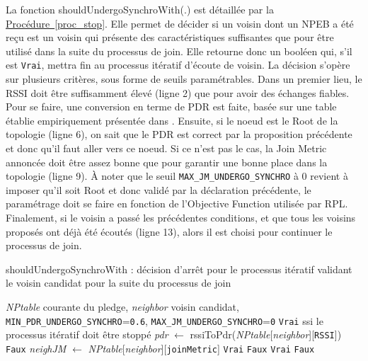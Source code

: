 \documentclass[]{report}
\newcommand{\wordlink}[2]{\hyperref[#2]{#1~\ref{#2}}}
\begin{document}
La fonction shouldUndergoSynchroWith(.) est détaillée par la \wordlink{Procédure}{proc_stop}.
Elle permet de décider si un voisin dont un NPEB a été reçu est un voisin qui présente des caractéristiques suffisantes que pour être utilisé dans la suite du processus de join. Elle retourne donc un booléen qui, s'il est \texttt{Vrai}, mettra fin au processus itératif d'écoute de voisin. La décision s'opère sur plusieurs critères, sous forme de seuils paramétrables. Dans un premier lieu, le RSSI doit être suffisamment élevé (ligne 2) que pour avoir des échanges fiables. Pour se faire, une conversion en terme de PDR est faite, basée sur une table établie empiriquement présentée dans \cite{simulating-6TiSCH}. Ensuite, si le noeud est le Root de la topologie (ligne 6), on sait que le PDR est correct par la proposition précédente et donc qu'il faut aller vers ce noeud. Si ce n'est pas le cas, la Join Metric annoncée doit être assez bonne que pour garantir une bonne place dans la topologie (ligne 9). À noter que le seuil \texttt{MAX\_JM\_UNDERGO\_SYNCHRO} à 0 revient à imposer qu'il soit Root et donc validé par la déclaration précédente, le paramétrage doit se faire en fonction de l'Objective Function utilisée par RPL. Finalement, si le voisin a passé les précédentes conditions, et que tous les voisins proposés ont déjà été écoutés (ligne 13), alors il est choisi pour continuer le processus de join. 

\newpage

\begin{algorithm}[!h]
\caption{shouldUndergoSynchroWith : décision d'arrêt pour le processus itératif validant le voisin candidat pour la suite du processus de join}
\begin{algorithmic}[1]
\Require \textit{NPtable} courante du pledge, \textit{neighbor} voisin candidat, \texttt{MIN\_PDR\_UNDERGO\_SYNCHRO}=\texttt{0.6}, \texttt{MAX\_JM\_UNDERGO\_SYNCHRO}=\texttt{0}
\Ensure \texttt{Vrai} ssi le processus itératif doit être stoppé
\State \textit{pdr} $\leftarrow$ rssiToPdr(\textit{NPtable}[\textit{neighbor}][\texttt{RSSI}])
\State\Return \texttt{Faux}
\EndIf
\State \textit{neighJM} $\leftarrow$ \textit{NPtable}[\textit{neighbor}][\texttt{joinMetric}]
\State\Return \texttt{Vrai}
\EndIf
{}
\State\Return \texttt{Faux}
\EndIf
{}
\State\Return \texttt{Vrai}
\EndIf
\EndIf
\State\Return \texttt{Faux}
\end{algorithmic}
\label{proc_stop}
\end{algorithm}
\vspace{0.4cm}
\end{document}

